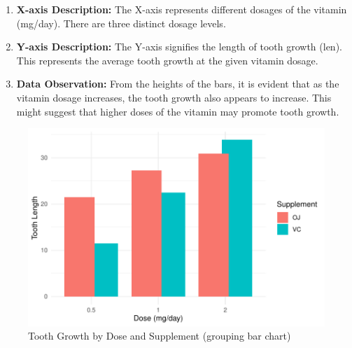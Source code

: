 \documentclass{article}\usepackage[]{graphicx}\usepackage[]{xcolor}
\newenvironment{knitrout}{}{} %
\begin{document}
\begin{enumerate}
    \item \textbf{X-axis Description:} The X-axis represents different dosages of the vitamin (mg/day). There are three distinct dosage levels.
    
    \item \textbf{Y-axis Description:} The Y-axis signifies the length of tooth growth (len). This represents the average tooth growth at the given vitamin dosage.
    \item \textbf{Data Observation:} From the heights of the bars, it is evident that as the vitamin dosage increases, the tooth growth also appears to increase. This might suggest that higher doses of the vitamin may promote tooth growth.
\end{enumerate}
\begin{figure}[htbp]
  \centering
  \begin{minipage}[b]{0.45\linewidth}
\begin{knitrout}\scriptsize
{}\color{fgcolor}

{\centering \includegraphics[width=\linewidth]{figure/beamer-barchart2-1} 

}


\end{knitrout}
    \caption{Tooth Growth by Dose and Supplement (grouping bar chart)}
    \label{fig:barchart2}
  \end{minipage}
  \hfill
  \begin{minipage}[b]{0.45\linewidth}
\begin{knitrout}\scriptsize
{}\color{fgcolor}


\end{knitrout}
\end{minipage}
\end{figure}
\end{document}
